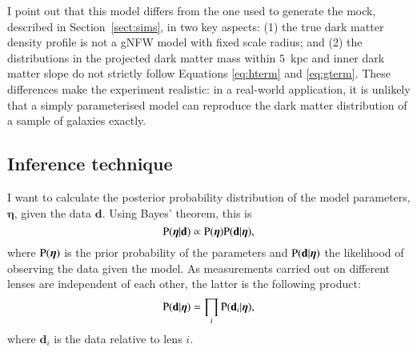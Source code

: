 \documentclass{aa}
\def\hyperpars{\boldsymbol{\eta}}
\def\data{\mathbf{d}}
\def\datai{\mathbf{d}_i}
\def\Sref#1{Section~\ref{#1}\xspace}
\def\pr{{\rm P}}
\begin{document}
I point out that this model differs from the one used to generate the mock, described in \Sref{sect:sims}, in two key aspects: (1) the true dark matter density profile is not a gNFW model with fixed scale radius; and (2) the distributions in the projected dark matter mass within $5$~kpc and inner dark matter slope do not  strictly follow Equations \ref{eq:hterm} and \ref{eq:gterm}.
These differences make the experiment realistic: in a real-world application, it is unlikely that a simply parameterised model can\textbf{} reproduce the dark matter distribution of a sample of galaxies  exactly. 

\subsection{Inference technique}

I want to calculate the posterior probability distribution of the model parameters, $\hyperpars$, given the data $\data$. Using Bayes' theorem, this is
\begin{equation}\label{eq:bayes}
\pr(\hyperpars|\data) \propto \pr(\hyperpars)\pr(\data|\hyperpars),
\end{equation}
where $\pr(\hyperpars)$ is the prior probability of the parameters and $\pr(\data|\hyperpars)$ the likelihood of observing the data given the model. As measurements carried out on different lenses are independent of each other, the latter is the following product:
\begin{equation}\label{eq:likelihood}
\pr(\data|\hyperpars) = \prod_i \pr(\datai|\hyperpars),
\end{equation}
where $\datai$ is the data relative to lens $i$.
\end{document}
